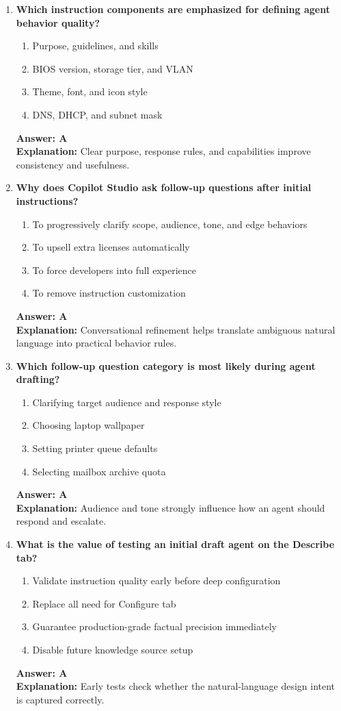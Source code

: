 \documentclass[10pt]{article}
\begin{document}
\begin{enumerate}[leftmargin=*]
\item \textbf{Which instruction components are emphasized for defining agent behavior quality?}
\begin{enumerate}[label=\Alph*.]
  \item Purpose, guidelines, and skills
  \item BIOS version, storage tier, and VLAN
  \item Theme, font, and icon style
  \item DNS, DHCP, and subnet mask
\end{enumerate}
\textbf{Answer: A}\\
\textbf{Explanation:} Clear purpose, response rules, and capabilities improve consistency and usefulness.

\item \textbf{Why does Copilot Studio ask follow-up questions after initial instructions?}
\begin{enumerate}[label=\Alph*.]
  \item To progressively clarify scope, audience, tone, and edge behaviors
  \item To upsell extra licenses automatically
  \item To force developers into full experience
  \item To remove instruction customization
\end{enumerate}
\textbf{Answer: A}\\
\textbf{Explanation:} Conversational refinement helps translate ambiguous natural language into practical behavior rules.

\item \textbf{Which follow-up question category is most likely during agent drafting?}
\begin{enumerate}[label=\Alph*.]
  \item Clarifying target audience and response style
  \item Choosing laptop wallpaper
  \item Setting printer queue defaults
  \item Selecting mailbox archive quota
\end{enumerate}
\textbf{Answer: A}\\
\textbf{Explanation:} Audience and tone strongly influence how an agent should respond and escalate.

\item \textbf{What is the value of testing an initial draft agent on the Describe tab?}
\begin{enumerate}[label=\Alph*.]
  \item Validate instruction quality early before deep configuration
  \item Replace all need for Configure tab
  \item Guarantee production-grade factual precision immediately
  \item Disable future knowledge source setup
\end{enumerate}
\textbf{Answer: A}\\
\textbf{Explanation:} Early tests check whether the natural-language design intent is captured correctly.


\end{enumerate}
\end{document}
